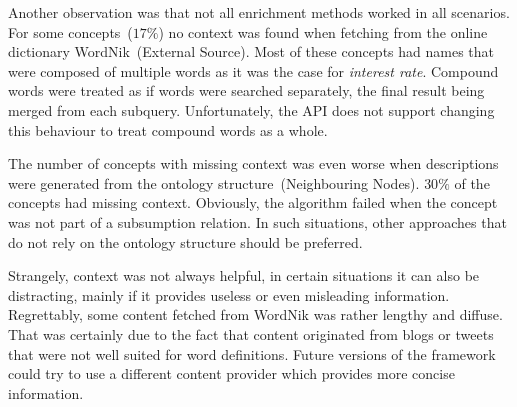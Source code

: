 Another observation was that not all enrichment methods worked in all scenarios.
For some concepts~($17\%$) no context was found when fetching from the online dictionary WordNik~(External Source). Most of these concepts had names that were composed of multiple words as it was the case for \emph{interest rate}. Compound words were treated as if words were searched separately, the final result being merged from each subquery. Unfortunately, the API does not support changing this behaviour to treat compound words as a whole. 

The number of concepts with missing context was even worse when descriptions were generated from the ontology structure~(Neighbouring Nodes). $30\%$ of the concepts had missing context. Obviously, the algorithm failed when the concept was not part of a subsumption relation. In such situations, other approaches that do not rely on the ontology structure should be preferred. 

Strangely, context was not always helpful, in certain situations it can also be distracting, mainly if it provides useless or even misleading information. Regrettably, some content fetched from WordNik was rather lengthy and diffuse. That was certainly due to the fact that content originated from blogs or tweets that were not well suited for word definitions. Future versions of the framework could try to use a different content provider which provides more concise information.
